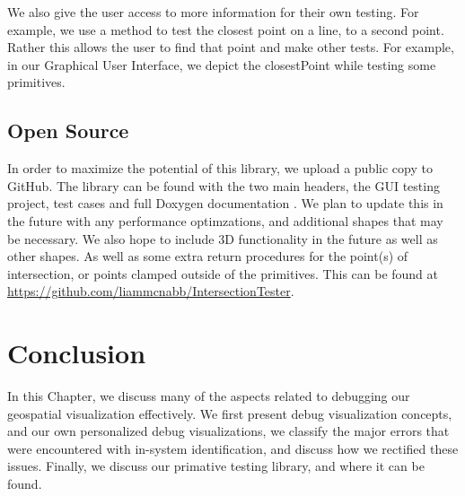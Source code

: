 We also give the user access to more information for their own testing. For example, we use a method to test the closest point on a line, to a second point. Rather this allows the user to find that point and make other tests. For example, in our Graphical User Interface, we depict the closestPoint while testing some primitives.


\subsection{Open Source} \label{sec:open}
In order to maximize the potential of this library, we upload a public copy to GitHub. The library can be found with the two main headers, the GUI testing project, test cases and full Doxygen documentation \cite{van2008doxygen}. We plan to update this in the future with any performance optimzations, and additional shapes that may be necessary. We also hope to include 3D functionality in the future as well as other shapes. As well as some extra return procedures for the point(s) of intersection, or points clamped outside of the primitives. This can be found at \url{https://github.com/liammcnabb/IntersectionTester}.

\section{Conclusion}
In this Chapter, we discuss many of the aspects related to debugging our geospatial visualization effectively. We first present debug visualization concepts, and our own personalized debug visualizations, we classify the major errors that were encountered with in-system identification, and discuss how we rectified these issues. Finally, we discuss our primative testing library, and where it can be found.

